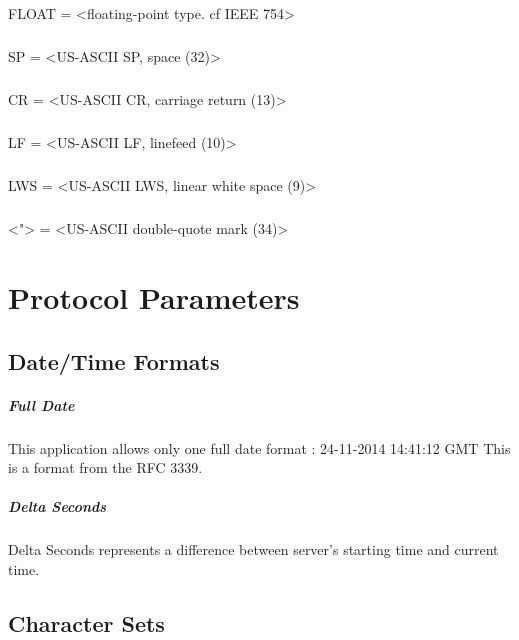     \paragraph{}
       FLOAT          = <floating-point type. cf IEEE 754>
    \paragraph{}
       SP             = <US-ASCII SP, space (32)>
    \paragraph{}
       CR             = <US-ASCII CR, carriage return (13)>
    \paragraph{}
       LF             = <US-ASCII LF, linefeed (10)>
    \paragraph{}
       LWS            = <US-ASCII LWS, linear white space (9)>
    \paragraph{}
       <">            = <US-ASCII double-quote mark (34)>


    \clearpage
\chapter{Protocol Parameters}
    \section{Date/Time Formats}
        \paragraph{Full Date}
      This application allows only one full date format :
         24-11-2014 14:41:12 GMT
      This is a format from the RFC 3339.
        \paragraph{Delta Seconds}
      Delta Seconds represents a difference between server's starting
      time and current time.
    \section{Character Sets}
